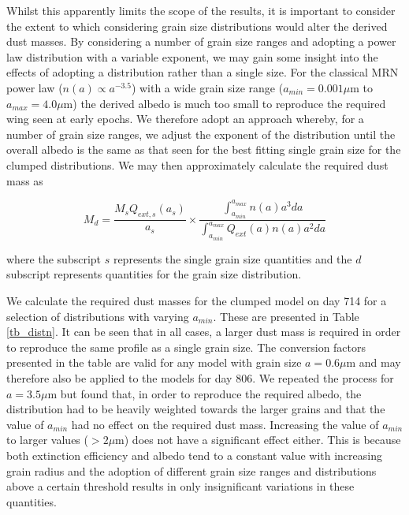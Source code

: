 \documentclass[useAMS,usenatbib,usegraphicx]{mnras}
\begin{document}
Whilst this apparently limits the scope of the results, it is important to consider the extent to which considering grain size distributions would alter the derived dust masses.  By considering a number of grain size ranges and adopting a power law distribution with a variable exponent, we may gain some insight into the effects of adopting a distribution rather than a single size.  For the classical MRN power law ($n(a) \propto a^{-3.5}$) with a wide grain size range ($a_{min} = 0.001 \mu$m to $a_{max} = 4.0 \mu$m) the derived albedo is much too small to reproduce the required wing seen at early epochs.  We therefore adopt an approach whereby, for a number of grain size ranges, we adjust the exponent of the distribution until the overall albedo is the same as that seen for the best fitting single grain size for the clumped distributions.  We may then approximately calculate the required dust mass as

\begin{equation}
\label{distn_conv}
M_{d}= \frac{M_s Q_{ext,s}(a_s)}{a_s} \times \frac{\int^{a_{max}}_{a_{min}} n(a) a^3 da}{\int^{a_{max}}_{a_{min}} Q_{ext}(a) n(a) a^2 da}
\end{equation}

where the subscript $s$ represents the single grain size quantities and the $d$ subscript represents quantities for the grain size distribution.  



We calculate the required dust masses for the clumped model on day 714 for a selection of distributions with varying $a_{min}$.  These are presented in Table \ref{tb_distn}.  It can be seen that in all cases, a larger dust mass is required in order to reproduce the same profile as a single grain size.  The conversion factors presented in the table are valid for any model with grain size $a=0.6\mu$m and may therefore also be applied to the models for day 806.  We repeated the process for $a=3.5 \mu$m but found that, in order to reproduce the required albedo, the distribution had to be heavily weighted towards the larger grains and that the value of $a_{min}$ had no effect on the required dust mass.  Increasing the value of $a_{min}$ to larger values ($>2\mu$m) does not have a significant effect either.  This is because both extinction efficiency and albedo tend to a constant value with increasing grain radius and the adoption of different grain size ranges and distributions above a certain threshold results in only insignificant variations in these quantities. 
\end{document}
